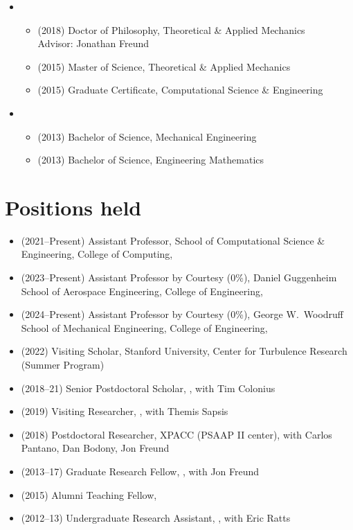 \begin{itemize}
    \item \UIUC
    \begin{itemize}
        \item[] (2018) Doctor of Philosophy, Theoretical \& Applied Mechanics \\
            \phantom{(2018)} Advisor: Jonathan Freund
        \item[] (2015) Master of Science, Theoretical \& Applied Mechanics
        \item[] (2015) Graduate Certificate, Computational Science \& Engineering
    \end{itemize}
    \item \UMD
    \begin{itemize}
        \item[] (2013) Bachelor of Science, Mechanical Engineering
        \item[] (2013) Bachelor of Science, Engineering Mathematics
    \end{itemize}
\end{itemize}


\section{Positions held}

\begin{itemize}
    \item (2021--Present) Assistant Professor, School of Computational Science \& Engineering, College of Computing, \GIT
    \item (2023--Present) Assistant Professor by Courtesy (0\%), Daniel Guggenheim School of Aerospace Engineering, College of Engineering, \GIT
    \item (2024--Present) Assistant Professor by Courtesy (0\%), George W.\ Woodruff School of Mechanical Engineering, College of Engineering, \GIT
    \item (2022) Visiting Scholar, Stanford University, Center for Turbulence Research (Summer Program)
    \item (2018--21) Senior Postdoctoral Scholar, \CIT, with Tim Colonius
    \item (2019) Visiting Researcher, \MIT, with Themis Sapsis
    \item (2018) Postdoctoral Researcher, XPACC (PSAAP II center), with Carlos Pantano, Dan Bodony, Jon Freund
    \item (2013--17) Graduate Research Fellow, \UIUC, with Jon Freund
    \item (2015) Alumni Teaching Fellow, \UIUC
    \item (2012--13) Undergraduate Research Assistant, \UMD, with Eric Ratts
\end{itemize}

